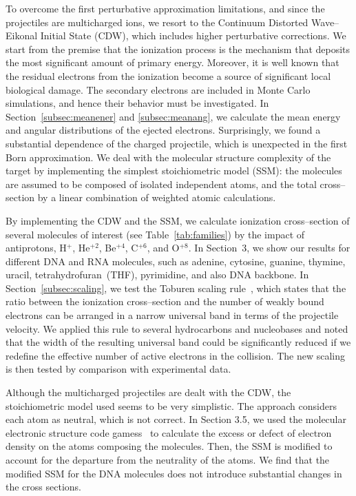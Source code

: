\documentclass[preprint]{revtex4-2}
\begin{document}
To overcome the first perturbative approximation limitations, and since 
the projectiles are multicharged ions, we resort to the Continuum 
Distorted Wave--Eikonal Initial State (CDW), which includes higher 
perturbative corrections. We start from the premise that the ionization 
process is the mechanism that deposits the most significant amount of 
primary energy. Moreover, it is well known that the residual electrons 
from the ionization become a source of significant local biological 
damage. The secondary electrons are included in Monte Carlo simulations, 
and hence their behavior must be investigated. 
In Section~\ref{subsec:meanener} and \ref{subsec:meanang}, we calculate
the mean energy and angular distributions of the ejected electrons. 
Surprisingly, we found a substantial dependence of the charged 
projectile, which is unexpected in the first Born approximation. 
We deal with the molecular structure complexity of the target by 
implementing the simplest stoichiometric model (SSM): the molecules are 
assumed to be composed of isolated independent atoms, and the total 
cross--section by a linear combination of weighted atomic calculations.

By implementing the CDW and the SSM, we calculate ionization 
cross--section of several molecules of interest (see 
Table~\ref{tab:families}) by the impact of antiprotons, H$^{+}$, 
He$^{+2}$, Be$^{+4}$, C$^{+6}$, and O$^{+8}$. 
In Section~3, we show our results for different DNA and RNA molecules, 
such as adenine, cytosine, guanine, thymine, uracil, tetrahydrofuran~(THF), 
pyrimidine, and also DNA backbone. In Section~\ref{subsec:scaling}, we
test the Toburen scaling rule~\cite{toburen1975,toburen1976}, which 
states that the ratio between the ionization cross--section and the 
number of weakly bound electrons can be arranged in a narrow universal 
band in terms of the projectile velocity. We applied this rule to 
several hydrocarbons and nucleobases and noted that the width of the 
resulting universal band could be significantly reduced if we redefine 
the effective number of active electrons in the collision. The new 
scaling is then tested by comparison with experimental data.

Although the multicharged projectiles are dealt with the CDW, the 
stoichiometric model used seems to be very simplistic. The approach
considers each atom as neutral, which is not correct. In Section 3.5, 
we used the molecular electronic structure code 
{\sc gamess}~\cite{gamess} to calculate the excess or defect of 
electron density on the atoms composing the molecules. Then, the SSM is 
modified to account for the departure from the neutrality of the atoms. 
We find that the modified SSM for the DNA molecules does not introduce 
substantial changes in the cross sections.
\end{document}
